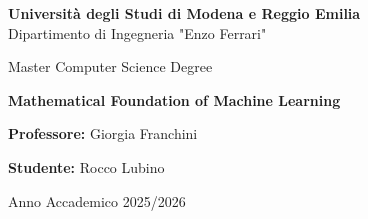 \documentclass[12pt,a4paper,oneside,onecolumn,openright]{book}
\begin{document}
\begin{titlepage}
  \begin{center}
  
      {\Large \textbf{Università degli Studi di Modena e Reggio Emilia}} \\[2mm]
      {\large Dipartimento di Ingegneria "Enzo Ferrari"} \\[15mm]
  
  
      
      {\large Master Computer Science Degree} \\
      
        \vspace{0.5cm}
      
      {\huge \textbf{Mathematical Foundation of Machine Learning}} \\

  
  
      \begin{flushleft}
          \textbf{Professore:} Giorgia Franchini \\[5mm]
      \end{flushleft}
  
      \vspace{1.2cm}
  
      \begin{flushright}
          \textbf{Studente:} Rocco Lubino \\
      \end{flushright}
  
      \vspace{2cm}
      {\large Anno Accademico 2025/2026}
  
  \end{center}
\end{titlepage}

  

\setcounter{tocdepth}{1}
\tableofcontents
\newpage  %

\end{document}
